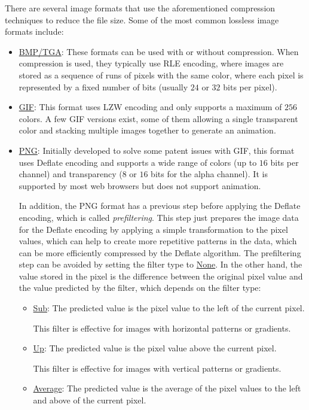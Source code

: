 There are several image formats that use the aforementioned compression techniques to reduce the file size. Some of the most common lossless image formats include:
\begin{itemize}
    \item \ul{BMP/TGA}: These formats can be used with or without compression. When compression is used, they typically use RLE encoding, where images are stored as a sequence of runs of pixels with the same color, where each pixel is represented by a fixed number of bits (usually $24$ or $32$ bits per pixel).
    
    \item \ul{GIF}: This format uses LZW encoding and only supports a maximum of $256$ colors. A few GIF versions exist, some of them allowing a single transparent color and stacking multiple images together to generate an animation.
    
    \item \ul{PNG}: Initially developed to solve some patent issues with GIF, this format uses Deflate encoding and supports a wide range of colors (up to $16$ bits per channel) and transparency ($8$ or $16$ bits for the alpha channel). It is supported by most web browsers but does not support animation.
    
    In addition, the PNG format has a previous step before applying the Deflate encoding, which is called \emph{prefiltering}. This step just prepares the image data for the Deflate encoding by applying a simple transformation to the pixel values, which can help to create more repetitive patterns in the data, which can be more efficiently compressed by the Deflate algorithm. The prefiltering step can be avoided by setting the filter type to \ul{None}. In the other hand, the value stored in the pixel is the difference between the original pixel value and the value predicted by the filter, which depends on the filter type:
    \begin{itemize}
        \item \ul{Sub}: The predicted value is the pixel value to the left of the current pixel.
        
        This filter is effective for images with horizontal patterns or gradients.
        \item \ul{Up}: The predicted value is the pixel value above the current pixel.
        
        This filter is effective for images with vertical patterns or gradients.
        \item \ul{Average}: The predicted value is the average of the pixel values to the left and above of the current pixel.
        

\end{itemize}
\end{itemize}
